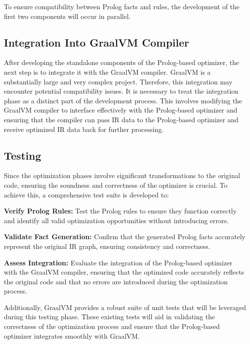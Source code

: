 To ensure compatibility between Prolog facts and rules, the development of the first two components will occur in parallel.

\subsection{Integration Into GraalVM Compiler}
After developing the standalone components of the Prolog-based optimizer, the next step is to integrate it with the GraalVM compiler. GraalVM is a substantially large and very complex project. Therefore, this integration may encounter potential compatibility issues. It is necessary to treat the integration phase as a distinct part of the development process. This involves modifying the GraalVM compiler to interface effectively with the Prolog-based optimizer and ensuring that the compiler can pass IR data to the Prolog-based optimizer and receive optimized IR data back for further processing.

\subsection{Testing}
Since the optimization phases involve significant transformations to the original code, ensuring the soundness and correctness of the optimizer is crucial. To achieve this, a comprehensive test suite is developed to:
\begin{description}
    \item \textbf{Verify Prolog Rules:} Test the Prolog rules to ensure they function correctly and identify all valid optimization opportunities without introducing errors.
    \item \textbf{Validate Fact Generation:} Confirm that the generated Prolog facts accurately represent the original IR graph, ensuring consistency and correctness.
    \item \textbf{Assess Integration:} Evaluate the integration of the Prolog-based optimizer with the GraalVM compiler, ensuring that the optimized code accurately reflects the original code and that no errors are introduced during the optimization process.
\end{description}
Additionally, GraalVM provides a robust suite of unit tests that will be leveraged during this testing phase. These existing tests will aid in validating the correctness of the optimization process and ensure that the Prolog-based optimizer integrates smoothly with GraalVM.

